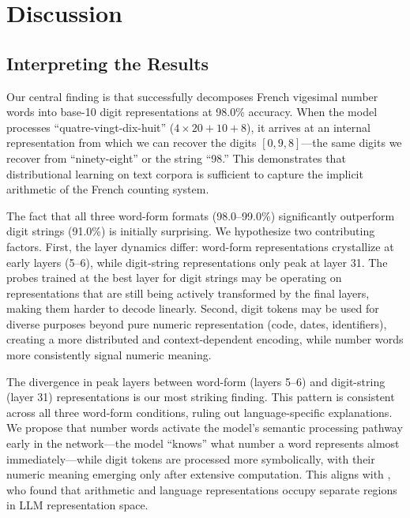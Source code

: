 \section{Discussion}
\label{sec:discussion}

\subsection{Interpreting the Results}

Our central finding is that \mistral successfully decomposes French vigesimal number words into base-10 digit representations at 98.0\% accuracy. When the model processes ``quatre-vingt-dix-huit'' ($4\times20+10+8$), it arrives at an internal representation from which we can recover the digits $[0, 9, 8]$---the same digits we recover from ``ninety-eight'' or the string ``98.'' This demonstrates that distributional learning on text corpora is sufficient to capture the implicit arithmetic of the French counting system.

The fact that all three word-form formats (98.0--99.0\%) significantly outperform digit strings (91.0\%) is initially surprising. We hypothesize two contributing factors. First, the layer dynamics differ: word-form representations crystallize at early layers (5--6), while digit-string representations only peak at layer 31. The probes trained at the best layer for digit strings may be operating on representations that are still being actively transformed by the final layers, making them harder to decode linearly. Second, digit tokens may be used for diverse purposes beyond pure numeric representation (code, dates, identifiers), creating a more distributed and context-dependent encoding, while number words more consistently signal numeric meaning.

The divergence in peak layers between word-form (layers 5--6) and digit-string (layer 31) representations is our most striking finding. This pattern is consistent across all three word-form conditions, ruling out language-specific explanations. We propose that number words activate the model's semantic processing pathway early in the network---the model ``knows'' what number a word represents almost immediately---while digit tokens are processed more symbolically, with their numeric meaning emerging only after extensive computation. This aligns with \citet{kisako2025representational}, who found that arithmetic and language representations occupy separate regions in LLM representation space.

